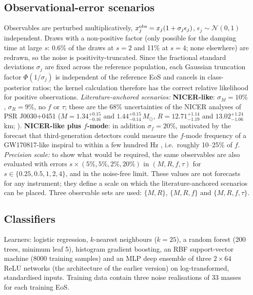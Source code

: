 \documentclass[11pt,a4paper]{article}
\newcommand{\Msun}{M_\odot}
\begin{document}
\subsection{Observational-error scenarios}\label{sec:errors}
Observables are perturbed multiplicatively, $x_j^{\rm obs}=x_j(1+\sigma_j\epsilon_j)$, $\epsilon_j\sim\mathcal N(0,1)$ independent. Draws with a non-positive factor (only possible for the damping time at large $s$: 0.6\% of the draws at $s=2$ and 11\% at $s=4$; none elsewhere) are redrawn, so the noise is positivity-truncated. Since the fractional standard deviations $\sigma_j$ are fixed across the reference population, each Gaussian truncation factor $\Phi(1/\sigma_j)$ is independent of the reference EoS and cancels in class-posterior ratios; the kernel calculation therefore has the correct relative likelihood for positive observations.
\emph{Literature-anchored scenarios:}
\textbf{NICER-like}: $\sigma_M=10\%$, $\sigma_R=9\%$, no $f$ or $\tau$; these are the 68\% uncertainties of the NICER analyses of PSR J0030+0451 ($M=1.34^{+0.15}_{-0.16}$ and $1.44^{+0.15}_{-0.14}\,\Msun$, $R=12.71^{+1.14}_{-1.19}$ and $13.02^{+1.24}_{-1.06}$\,km; \citealt{Riley19,Miller19}).
\textbf{NICER-like plus $f$-mode}: in addition $\sigma_f=20\%$, motivated by the forecast that third-generation detectors could measure the $f$-mode frequency of a GW170817-like inspiral to within a few hundred Hz \citep{Williams22}, i.e.\ roughly 10--25\% of $f$.
\emph{Precision scale:} to show what would be required, the same observables are also evaluated with errors $s\times(5\%,5\%,2\%,20\%)$ in $(M,R,f,\tau)$ for $s\in\{0.25,0.5,1,2,4\}$, and in the noise-free limit. These values are not forecasts for any instrument; they define a scale on which the literature-anchored scenarios can be placed. Three observable sets are used: $\{M,R\}$, $\{M,R,f\}$ and $\{M,R,f,\tau\}$.

\subsection{Classifiers}
Learners: logistic regression, $k$-nearest neighbours ($k=25$), a random forest (200 trees, minimum leaf 5), histogram gradient boosting, an RBF support-vector machine (8000 training samples) and an MLP deep ensemble \citep{Lakshminarayanan17} of three $2\times64$ ReLU networks (the architecture of the earlier version) on log-transformed, standardised inputs. Training data contain three noise realisations of 33 masses for each training EoS.
\end{document}

